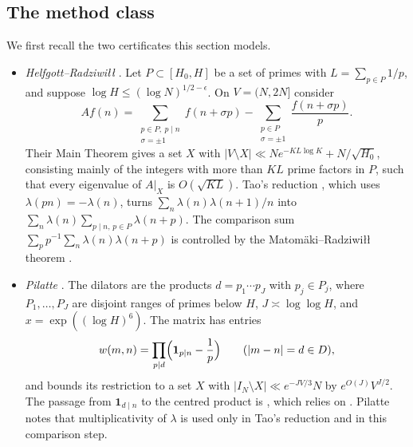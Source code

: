 \documentclass[11pt]{amsart}
\theoremstyle{definition}
\theoremstyle{remark}
\begin{document}
\subsection{The method class}
We first recall the two certificates this section models.
\begin{itemize}
\item \emph{Helfgott--Radziwiłł} \cite{HR21}. Let $P\subset[H_0,H]$ be a set of primes with $L=\sum_{p\in P}1/p$, and suppose $\log H\le(\log N)^{1/2-\epsilon}$. On $V=(N,2N]$ consider
\[
Af(n)=\sum_{\substack{p\in P,\ p\mid n\\ \sigma=\pm1}}f(n+\sigma p)-\sum_{\substack{p\in P\\ \sigma=\pm1}}\frac{f(n+\sigma p)}{p}.
\]
Their Main Theorem gives a set $X$ with $|V\setminus X|\ll Ne^{-KL\log K}+N/\sqrt{H_0}$, consisting mainly of the integers with more than $KL$ prime factors in $P$, such that every eigenvalue of $A|_X$ is $O(\sqrt{KL})$. Tao's reduction \cite{Tao16}, which uses $\lambda(pn)=-\lambda(n)$, turns $\sum_n\lambda(n)\lambda(n+1)/n$ into $\sum_n\lambda(n)\sum_{p\mid n,\,p\in P}\lambda(n+p)$. The comparison sum $\sum_p p^{-1}\sum_n\lambda(n)\lambda(n+p)$ is controlled by the Matomäki--Radziwiłł theorem \cite{MR16}.
\item \emph{Pilatte} \cite{Pil23}. The dilators are the products $d=p_1\cdots p_J$ with $p_j\in P_j$, where $P_1,\dots,P_J$ are disjoint ranges of primes below $H$, $J\asymp\log\log H$, and $x=\exp((\log H)^6)$. The matrix has entries
\[
w(m,n)=\prod_{p\mid d}\Bigl(\mathbf 1_{p\mid n}-\frac1p\Bigr)\qquad(|m-n|=d\in D),
\]
and \cite[Prop.~3.4]{Pil23} bounds its restriction to a set $X$ with $|I_N\setminus X|\ll e^{-JV/3}N$ by $e^{O(J)}V^{J/2}$. The passage from $\mathbf 1_{d\mid n}$ to the centred product is \cite[Prop.~3.1]{Pil23}, which relies on \cite{MRT15}. Pilatte notes that multiplicativity of $\lambda$ is used only in Tao's reduction and in this comparison step.
\end{itemize}
\end{document}
